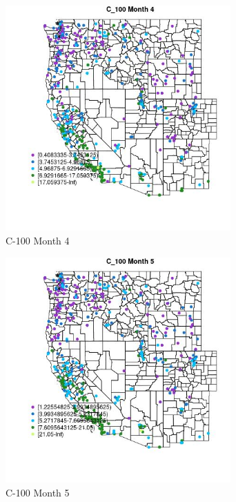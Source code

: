 \begin{figure} 
\centering  
\includegraphics[width=0.77\textwidth]{Code_Outputs/ML_input_report_ML_input_PM25_Step5_part_d_de_duplicated_aves_ML_input_MapObsMo4C_100.jpg} 
\caption{\label{fig:ML_input_report_ML_input_PM25_Step5_part_d_de_duplicated_aves_ML_inputMapObsMo4C_100}C-100 Month 4} 
\end{figure} 
 

\begin{figure} 
\centering  
\includegraphics[width=0.77\textwidth]{Code_Outputs/ML_input_report_ML_input_PM25_Step5_part_d_de_duplicated_aves_ML_input_MapObsMo5C_100.jpg} 
\caption{\label{fig:ML_input_report_ML_input_PM25_Step5_part_d_de_duplicated_aves_ML_inputMapObsMo5C_100}C-100 Month 5} 
\end{figure} 
 

